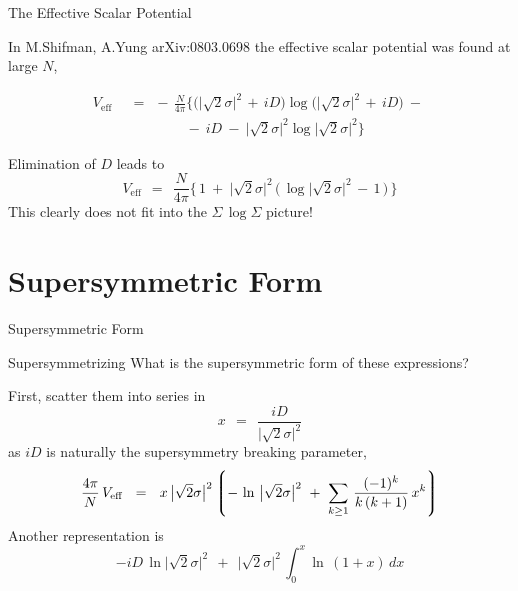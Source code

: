 \documentclass{beamer}
\begin{document}
\begin{frame}{The Effective Scalar Potential}

	In {\sc M.Shifman, A.Yung arXiv:0803.0698} the effective scalar potential
	was found at large $ N $,

\begin{align*}
%
	V_\text{eff}  &  ~~=~~    -\, \frac{N}{4\pi} 
	\bigg\{
		\big( \big|\sqrt{2}\sigma\big|^2 \,+\, iD \big) 
		\log \big( \big|\sqrt{2}\sigma\big|^2 \,+\, iD \big)
		~-~
	\\
%
	&
	\qquad\qquad~
		~-~
		iD
		~-~
		\big|\sqrt{2}\sigma\big|^2 \log \big|\sqrt{2}\sigma\big|^2
	\bigg\}
\end{align*}

	Elimination of $ D $ leads to 
\[
	V_\text{eff}   ~~=~~ \frac{N}{4\pi}
	\bigg\{\,
		1 ~+~  \big|\sqrt{2}\sigma\big|^2\, \Big(\, \log \big|\sqrt{2}\sigma\big|^2 \,-\, 1 \,\Big)
	\,\bigg\}
\]
	This clearly does not fit into the $ \Sigma \, \log \Sigma $ picture!

\end{frame}




\section{Supersymmetric Form}
\begin{frame}{}
\fontsize{50pt}{50pt}\selectfont
\begin{center}
        Supersymmetric Form
\end{center}
\end{frame}


\begin{frame}{Supersymmetrizing}
	What is the supersymmetric form of these expressions?

	First, scatter them into series in
\[
	x    ~~=~~    \frac{iD}{\big|\sqrt{2}\sigma\big|^2}
\]
	as $ iD $ is naturally the supersymmetry breaking parameter,
\[
	 \frac{4\pi}{N}\, V_\text{eff}    ~~=~~
		x\, \big|\sqrt{2}\sigma\big|^2 \left\lgroup -\, \ln\, \big|\sqrt{2}\sigma\big|^2 ~+~
		\sum_{k \geq 1}\, \frac{(-1)^k} 
                                      { k\,(k + 1) }\, x^k \right\rgroup
\]
	Another representation is
\[
	- iD\, \ln \big|\sqrt{2}\sigma\big|^2 ~~+~~ \big|\sqrt{2}\sigma\big|^2\, \int_0^x \ln\, (1 + x)\, dx
\]
\end{frame}
\end{document}
